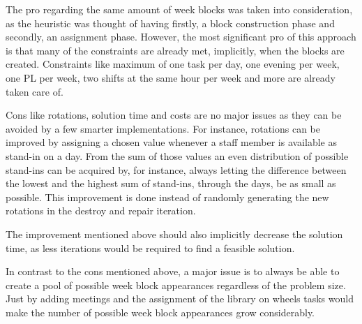 The pro regarding the same amount of week blocks was taken into consideration, as the heuristic was thought of having firstly, a block construction phase and secondly, an assignment phase. However, the most significant pro of this approach is that many of the constraints are already met, implicitly, when the blocks are created. Constraints like maximum of one task per day, one evening per week, one PL per week, two shifts at the same hour per week and more are already taken care of. 

Cons like rotations, solution time and costs are no major issues as they can be avoided by a few smarter implementations. For instance, rotations can be improved by assigning a chosen value whenever a staff member is available as stand-in on a day. From the sum of those values an even distribution of possible stand-ins can be acquired by, for instance, always letting the difference between the lowest and the highest sum of stand-ins, through the days, be as small as possible. This improvement is done instead of randomly generating the new rotations in the destroy and repair iteration. 

The improvement mentioned above should also implicitly decrease the solution time, as less iterations would be required to find a feasible solution.

In contrast to the cons mentioned above, a major issue is to always be able to create a pool of possible week block appearances regardless of the problem size. Just by adding meetings and the assignment of the library on wheels tasks would make the number of possible week block appearances grow considerably.

